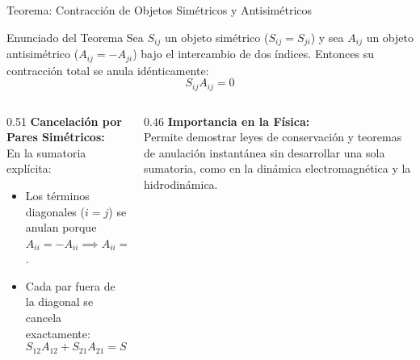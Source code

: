 \documentclass[10pt,aspectratio=169]{beamer}
\begin{document}
\begin{frame}{Teorema: Contracción de Objetos Simétricos y Antisimétricos}
  \begin{block}{Enunciado del Teorema}
    \footnotesize
    Sea $S_{ij}$ un objeto simétrico ($S_{ij} = S_{ji}$) y sea $A_{ij}$ un objeto antisimétrico ($A_{ij} = -A_{ji}$) bajo el intercambio de dos índices. Entonces su contracción total se anula idénticamente:
    \[
    \boxed{S_{ij} A_{ij} = 0}
    \]
  \end{block}
  \vspace{0.1cm}
  \begin{columns}[c]
    \begin{column}{0.51\textwidth}
      \footnotesize
      \textbf{Cancelación por Pares Simétricos:}\\[2pt]
      En la sumatoria explícita:
      \begin{itemize}
        \itemsep2pt
        \item Los términos diagonales ($i=j$) se anulan porque $A_{ii} = -A_{ii} \implies A_{ii} = 0$.
        \item Cada par fuera de la diagonal se cancela exactamente:
        \[
        S_{12}A_{12} + S_{21}A_{21} = S_{12}A_{12} + S_{12}(-A_{12}) = 0.
        \]
      \end{itemize}
    \end{column}
    \begin{column}{0.46\textwidth}
      \footnotesize
      \textbf{Importancia en la Física:}\\[2pt]
      Permite demostrar leyes de conservación y teoremas de anulación instantánea sin desarrollar una sola sumatoria, como en la dinámica electromagnética y la hidrodinámica.
    \end{column}
  \end{columns}
\end{frame}
\end{document}
